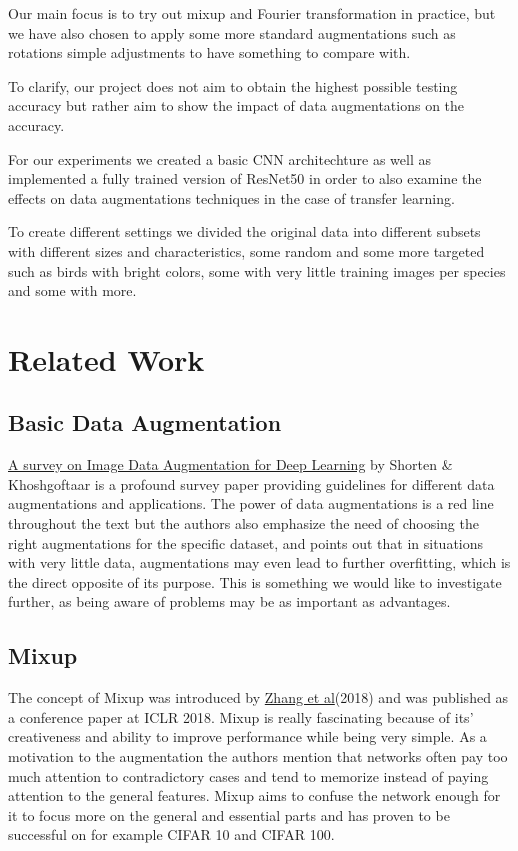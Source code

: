 \documentclass{article}
\begin{document}
Our main focus is to try out mixup and Fourier transformation in practice, but we have also chosen to apply some more standard augmentations such as rotations simple adjustments to have something to compare with.

To clarify, our project does not aim to obtain the highest possible testing accuracy but rather aim to show the impact of data augmentations 
on the accuracy. 

For our experiments we created a basic CNN architechture as well as implemented a fully trained version of ResNet50 in order to also examine the effects on data augmentations techniques in the case of transfer learning.

To create different settings we divided the original data into different subsets with different sizes and characteristics, some random and some more targeted such as birds with bright colors, some with very little training images per species and some with more.

\section{Related Work}

\subsection{Basic Data Augmentation}

\href{https://link.springer.com/article/10.1186/s40537-019-0197-0}{A survey on Image Data Augmentation for Deep Learning} by Shorten \& Khoshgoftaar is a profound survey paper providing guidelines for different data augmentations and applications. The power of data augmentations is a red line throughout the text but the authors also emphasize the need of choosing the right augmentations for the specific dataset, and points out that in situations with very little data, augmentations may even lead to further overfitting, which is the direct opposite of its purpose. This is something we would like to investigate further, as being aware of problems may be as important as advantages.


\subsection{Mixup}

The concept of Mixup was introduced by \href{https://arxiv.org/pdf/1710.09412.pdf}{Zhang et al}(2018) and was published as a conference paper at ICLR 2018. Mixup is really fascinating because of its' creativeness and ability to improve performance while being very simple. As a motivation to the augmentation the authors mention that networks often pay too much attention to contradictory cases and tend to memorize instead of paying attention to the general features. Mixup aims to confuse the network enough for it to focus more on the general and essential parts and has proven to be successful on for example CIFAR 10 and CIFAR 100.
\end{document}
